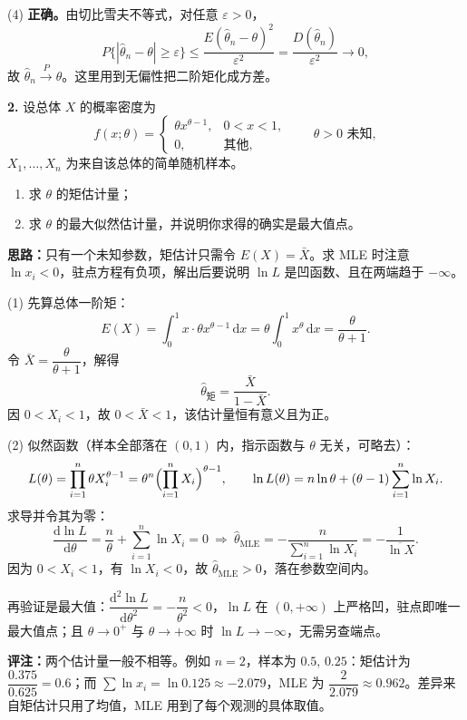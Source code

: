 (4) \textbf{正确。}由切比雪夫不等式，对任意 $\varepsilon>0$，
\[
P\{|\widehat\theta_n-\theta|\geqslant\varepsilon\}
\leqslant\frac{E(\widehat\theta_n-\theta)^2}{\varepsilon^2}
=\frac{D(\widehat\theta_n)}{\varepsilon^2}\to 0,
\]
故 $\widehat\theta_n\xrightarrow{P}\theta$。这里用到无偏性把二阶矩化成方差。


\else \answerarea[8] \fi%
\textbf{2.} 设总体 $X$ 的概率密度为
\[
f(x;\theta)=\begin{cases}
\theta x^{\theta-1}, & 0<x<1,\\
0, & \text{其他},
\end{cases}
\qquad \theta>0 \text{ 未知},
\]
$X_1,\ldots,X_n$ 为来自该总体的简单随机样本。
\begin{enumerate}[label=(\arabic*)]
    \item 求 $\theta$ 的矩估计量；
    \item 求 $\theta$ 的最大似然估计量，并说明你求得的确实是最大值点。
\end{enumerate}

\ifshowsolutions%
\textbf{思路：}只有一个未知参数，矩估计只需令 $E(X)=\bar X$。求 MLE 时注意 $\ln x_i<0$，驻点方程有负项，解出后要说明 $\ln L$ 是凹函数、且在两端趋于 $-\infty$。

(1) 先算总体一阶矩：
\[
E(X)=\int_{0}^{1}x\cdot\theta x^{\theta-1}\,\mathrm{d}x
=\theta\int_{0}^{1}x^{\theta}\,\mathrm{d}x
=\frac{\theta}{\theta+1}.
\]
令 $\bar X=\dfrac{\theta}{\theta+1}$，解得
\[
\widehat\theta_{\text{矩}}=\frac{\bar X}{1-\bar X}.
\]
因 $0<X_i<1$，故 $0<\bar X<1$，该估计量恒有意义且为正。

(2) 似然函数（样本全部落在 $(0,1)$ 内，指示函数与 $\theta$ 无关，可略去）：
\[
L(\theta)=\prod_{i=1}^{n}\theta X_i^{\theta-1}
=\theta^{n}\Bigl(\prod_{i=1}^{n}X_i\Bigr)^{\theta-1},
\qquad
\ln L(\theta)=n\ln\theta+(\theta-1)\sum_{i=1}^{n}\ln X_i.
\]
求导并令其为零：
\[
\frac{\mathrm{d}\ln L}{\mathrm{d}\theta}=\frac{n}{\theta}+\sum_{i=1}^{n}\ln X_i=0
\ \Longrightarrow\
\widehat\theta_{\text{MLE}}=-\frac{n}{\sum_{i=1}^{n}\ln X_i}
=-\frac{1}{\overline{\ln X}}.
\]
因为 $0<X_i<1$，有 $\ln X_i<0$，故 $\widehat\theta_{\text{MLE}}>0$，落在参数空间内。

再验证是最大值：$\dfrac{\mathrm{d}^{2}\ln L}{\mathrm{d}\theta^{2}}=-\dfrac{n}{\theta^{2}}<0$，$\ln L$ 在 $(0,+\infty)$ 上严格凹，驻点即唯一最大值点；且 $\theta\to0^{+}$ 与 $\theta\to+\infty$ 时 $\ln L\to-\infty$，无需另查端点。

\textbf{评注：}两个估计量一般不相等。例如 $n=2$，样本为 $0.5,\,0.25$：矩估计为 $\dfrac{0.375}{0.625}=0.6$；而 $\sum\ln x_i=\ln0.125\approx-2.079$，MLE 为 $\dfrac{2}{2.079}\approx0.962$。差异来自矩估计只用了均值，MLE 用到了每个观测的具体取值。

